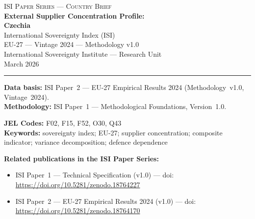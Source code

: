 \documentclass[12pt,a4paper]{article}
\begin{document}
\hypersetup{pageanchor=false}

\begin{titlepage}
\centering
\vspace*{2cm}
{\Large\textsc{ISI Paper Series --- Country Brief}}\\[1.2cm]
{\LARGE\bfseries External Supplier Concentration Profile:\\[0.3em]
Czechia}\\[1.5cm]
{\large International Sovereignty Index (ISI)\\[0.3em]
EU-27 --- Vintage 2024 --- Methodology v1.0}\\[1.2cm]
{\large International Sovereignty Institute --- Research Unit}\\[0.8cm]
{\large March 2026}

\vspace{0.8cm}
\noindent\rule{\textwidth}{0.4pt}
\vspace{0.4cm}

\begin{flushleft}
\noindent\textbf{Data basis:} ISI Paper~2 --- EU-27 Empirical Results 2024 (Methodology~v1.0, Vintage~2024).\\[4pt]
\noindent\textbf{Methodology:} ISI Paper~1 --- Methodological Foundations, Version~1.0.

\medskip

\noindent\textbf{JEL Codes:} F02, F15, F52, O30, Q43\\[4pt]
\noindent\textbf{Keywords:} sovereignty index; EU-27; supplier concentration; composite indicator; variance decomposition; defence dependence

\medskip

\noindent\textbf{Related publications in the ISI Paper Series:}
\begin{itemize}[nosep,leftmargin=1.5em]
\item ISI Paper~1 --- Technical Specification (v1.0) --- doi:\\
  \url{https://doi.org/10.5281/zenodo.18764227}
\item ISI Paper~2 --- EU-27 Empirical Results 2024 (v1.0) --- doi:\\
  \url{https://doi.org/10.5281/zenodo.18764170}
\end{itemize}
\end{flushleft}
\vfill
\end{titlepage}
\end{document}
